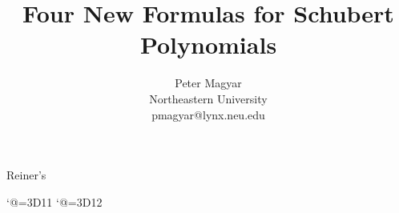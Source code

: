%
Reiner's
%

%
%
 \def\Bbb{\bf}
 \def\frak{\cal}
 \def\boxtimes{\Box\hspace{-0.76em}\times}
 \def\bigtimes{\prod}
%
%
%
\newcommand{\sgn}{\mathop{\rm sgn}}
\newcommand{\Row}{\mathop{\rm Row}}
\newcommand{\Col}{\mathop{\rm Col}}
\newcommand{\Ker}{\mathop{\rm Ker}}
\newcommand{\IM}{\mathop{\rm Im}}
\newcommand{\Sym}{\mathop{\rm Sym}\mbox{}}
\newcommand{\St}{\mathop{\rm St}}
\newcommand{\Gr}{\mathop{\rm Gr}}
\newcommand{\id}{\mathop{\rm id}}
\newcommand{\incl}{\mathop{\rm incl}}
\newcommand{\rest}{\mathop{\rm rest}\mbox{}}
\newcommand{\rank}{\mathop{\rm rank}}
\newcommand{\pr}{ {\mathop{\rm pr}} }
\newcommand{\wt}{ {\mathop{\rm wt}} }
\newcommand{\tr}{\mathop{\rm tr}}
\newcommand{\Hom}{\mathop{\rm Hom}}
\newcommand{\Char}{ {\mathop{\rm char}} }
\newcommand{\Span}{ {\mathop{\rm Span}} }
\newcommand{\diag}{\mathop{\rm diag}}
%
\newtheorem{thm}{Theorem}
\newtheorem{lem}{Lemma}
\newtheorem{conj}{Conjecture}
%
\newcommand{\eqdef}{\stackrel{\rm def}{=3D}}
\newcommand{\CC}{{\Bbb C}}
\newcommand{\C}{{\Bbb C}}
\newcommand{\R}{{\Bbb R}}
\newcommand{\Z}{{\Bbb Z}}
\newcommand{\ZZ}{{\Bbb Z}}
\newcommand{\NN}{{\Bbb N}}
\newcommand{\PP}{{\Bbb P}}
\newcommand{\al}{{\alpha}}
\newcommand{\be}{{\beta}}
\newcommand{\om}{{\varpi}}
\newcommand{\Sig}{{\Sigma}}
\newcommand{\sig}{{\sigma}}
\newcommand{\alD}{{\alpha_D}}
\newcommand{\beD}{{\beta_D}}
\newcommand{\VV}{ {\cal V} }
\newcommand{\Vn}{ V^{\otimes n} }
\newcommand{\lam}{ \lambda }
\newcommand{\FF}{ { \cal F } }
\newcommand{\FD}{ \FF_D }
\newcommand{\FDB}{ \FF_D^B }
\newcommand{\SVD}{ S_D^{\VV} }
\newcommand{\II}{ { \cal I } }
\newcommand{\ID}{ \II_D }
\newcommand{\LL}{ {\cal L} }
\newcommand{\LD}{ \LL_D }
\newcommand{\EE}{ {\cal E} }
\newcommand{\OO}{ {\cal O} }
\newcommand{\TT}{ {\cal T} }
\newcommand{\SS}{ {\frak S} }
\newcommand{\DV}{ \Delta_D V}
\newcommand{\DVV}{ \Delta_D^{\VV} V}
\newcommand{\Dh}{ \widehat{D} }
\newcommand{\Dt}{ \widetilde{D} }
\newcommand{\Ch}{ \widehat{C} }
\newcommand{\tB}{ \stackrel{B}{\times} }
\newcommand{\tw}{ \tilde{w} }
\newcommand{\tu}{ \tilde{u} }


%
\flushbottom
%
\title{Four New Formulas for Schubert Polynomials}
\author{Peter Magyar \\[.1em]
Northeastern University\\[.1em]
{ pmagyar@lynx.neu.edu}}
%
 \catcode`@=3D11
 \def\@date{November 1995}
 \catcode`@=3D12
%



